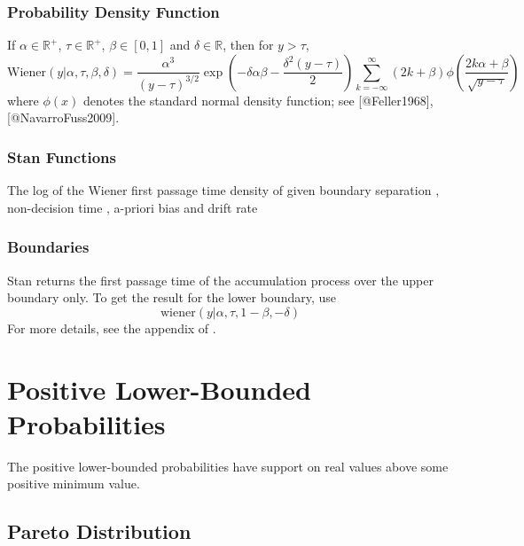 \begin{description}
{\begin{description}
\subsection{Probability Density Function}


If $\alpha \in \mathbb{R}^+$, $\tau \in \mathbb{R}^+$, $\beta \in [0, 1]$ and $\delta \in \mathbb{R}$, then for $y > \tau$, \[ \text{Wiener}(y|\alpha, \tau, \beta, \delta) = \frac{\alpha^3}{(y-\tau)^{3/2}} \exp \! \left(- \delta \alpha \beta - \frac{\delta^2(y-\tau)}{2}\right) \sum_{k = - \infty}^{\infty} (2k + \beta) \phi \! \left(\frac{2k \alpha + \beta}{\sqrt{y - \tau}}\right) \] where $\phi(x)$ denotes the standard normal density function;  see [@Feller1968], [@NavarroFuss2009].




\subsection{Stan Functions}

\begin{description}   {The log of the Wiener first passage time  density of  given boundary separation ,  non-decision time , a-priori bias  and  drift rate } \end{description}


\subsection{Boundaries}


Stan returns the first passage time of the accumulation process over the upper boundary only. To get the result for the lower boundary, use \[ \text{wiener}(y | \alpha, \tau, 1 - \beta, - \delta) \] For more details, see the appendix of \citet{Vandekerckhove-Wabersich:2014}.


\chapter{Positive Lower-Bounded Probabilities}


The positive lower-bounded probabilities have support on real values above some positive minimum value.


\section{Pareto Distribution}



\end{description}}
\end{description}
